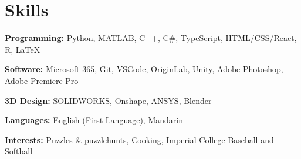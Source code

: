\documentclass{cv}
\begin{document}
\section{Skills}
\begin{subsections}
    \item \textbf{Programming:} Python, MATLAB, C++, C\#, TypeScript, HTML/CSS/React, R, \LaTeX
    \item \textbf{Software:} Microsoft 365, Git, VSCode, OriginLab, Unity, Adobe Photoshop, Adobe Premiere Pro
    \item \textbf{3D Design:} SOLIDWORKS, Onshape, ANSYS, Blender
    \item \textbf{Languages:} English (First Language), Mandarin
    \item \textbf{Interests:} Puzzles \& puzzlehunts, Cooking, Imperial College Baseball and Softball
\end{subsections}
\end{document}
